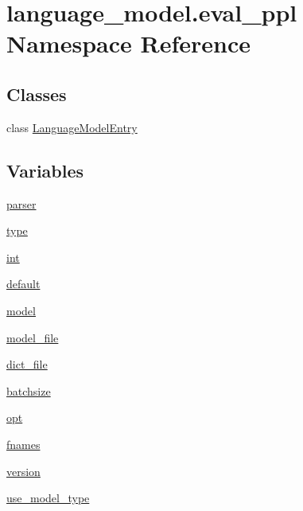 \hypertarget{namespacelanguage__model_1_1eval__ppl}{}\section{language\+\_\+model.\+eval\+\_\+ppl Namespace Reference}
\label{namespacelanguage__model_1_1eval__ppl}
\subsection*{Classes}
\begin{DoxyCompactItemize}
\item 
class \hyperlink{classlanguage__model_1_1eval__ppl_1_1LanguageModelEntry}{Language\+Model\+Entry}
\end{DoxyCompactItemize}
\subsection*{Variables}
\begin{DoxyCompactItemize}
\item 
\hyperlink{namespacelanguage__model_1_1eval__ppl_a45981ffc7b8bc90dfc7b6174d7461e8e}{parser}
\item 
\hyperlink{namespacelanguage__model_1_1eval__ppl_a750e75a8688a4996ea96948e7e5150ba}{type}
\item 
\hyperlink{namespacelanguage__model_1_1eval__ppl_a7d12ee00479673c5c8d1f6d01faa272a}{int}
\item 
\hyperlink{namespacelanguage__model_1_1eval__ppl_a4bd739c0bc1c2a44ca004da00b00929c}{default}
\item 
\hyperlink{namespacelanguage__model_1_1eval__ppl_a283085c6267a716efda2fdad3ba4dd38}{model}
\item 
\hyperlink{namespacelanguage__model_1_1eval__ppl_a459da03ba3f83d46f8f820358043631a}{model\+\_\+file}
\item 
\hyperlink{namespacelanguage__model_1_1eval__ppl_ae8868751bf6404555342613dbea84517}{dict\+\_\+file}
\item 
\hyperlink{namespacelanguage__model_1_1eval__ppl_ac8bcf54cc64d6316f9119c107871f693}{batchsize}
\item 
\hyperlink{namespacelanguage__model_1_1eval__ppl_aba3c9374ac5406ca41a085d79c769163}{opt}
\item 
\hyperlink{namespacelanguage__model_1_1eval__ppl_a614e3f977cb9a72c937169c388d1cef6}{fnames}
\item 
\hyperlink{namespacelanguage__model_1_1eval__ppl_a8cb118eb13e859eb0a79b875ac7859cb}{version}
\item 
\hyperlink{namespacelanguage__model_1_1eval__ppl_a7a4b59869d10fb09cb2ff82597082841}{use\+\_\+model\+\_\+type}
\end{DoxyCompactItemize}


